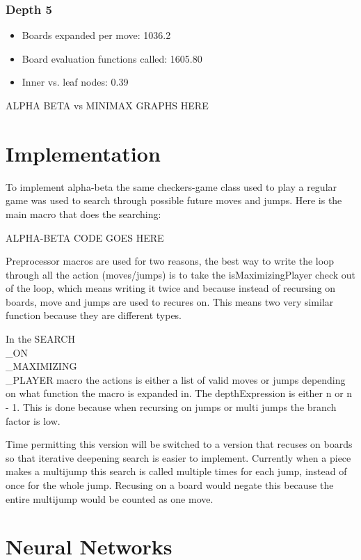 \documentclass{article}
\begin{document}
\subsubsection{Depth 5}
\begin{itemize}
	\item Boards expanded per move: 1036.2
	\item Board evaluation functions called: 1605.80
	\item Inner vs. leaf nodes: 0.39
\end{itemize}

 ALPHA BETA vs MINIMAX GRAPHS HERE

\section{Implementation}

To implement alpha-beta the same checkers-game class used to play a regular
game was used to search through possible future moves and jumps. Here is the
main macro that does the searching:

 ALPHA-BETA CODE GOES HERE

Preprocessor macros are used for two reasons, the best way to write the loop
through all the action (moves/jumps) is to take the isMaximizingPlayer check
out of the loop, which means writing it twice and because instead of recursing
on boards, move and jumps are used to recures on. This means two very similar
function because they are different types.

In the SEARCH\\_ON\\_MAXIMIZING\\_PLAYER macro the actions is either a list of valid
moves or jumps depending on what function the macro is expanded in. The
depthExpression is either n or n - 1. This is done because when recursing on
jumps or multi jumps the branch factor is low.

Time permitting this version
will be switched to a version that recuses on boards so that iterative
deepening search is easier to implement. Currently when a piece makes a
multijump this search is called multiple times for each jump, instead of once
for the whole jump. Recusing on a board would negate this because the entire
multijump would be counted as one move.

\section{Neural Networks}
\end{document}
